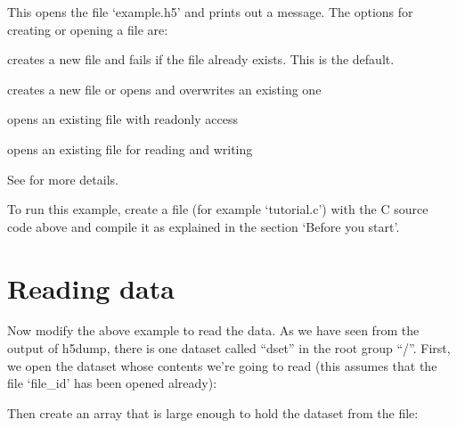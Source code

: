 \documentclass[letterpaper,10pt,english]{sphinxmanual}
\begin{document}
\sphinxAtStartPar
This opens the file ‘example.h5’ and prints out a message. The options for creating or opening a file are:
\begin{description}
\sphinxAtStartPar
creates a new file and fails if the file already exists. This is the default.

\sphinxAtStartPar
creates a new file or opens and overwrites an existing one

\sphinxAtStartPar
opens an existing file with read\sphinxhyphen{}only access

\sphinxAtStartPar
opens an existing file for reading and writing

\end{description}

\sphinxAtStartPar
See  for more details.

\sphinxAtStartPar
To run this example, create a file (for example ‘tutorial.c’) with the C source code above and compile it as explained in the section ‘Before you start’.


\chapter{Reading data}
\label{\detokenize{index:reading-data}}
\sphinxAtStartPar
Now modify the above example to read the data. As we have seen from the output of h5dump, there is one dataset called “dset” in the root group “/”. First, we open the dataset whose contents we’re going to read (this assumes that the file ‘file\_id’ has been opened already):

\begin{sphinxVerbatim}[commandchars=\\\{\}]
    
\end{sphinxVerbatim}

\sphinxAtStartPar
Then create an array that is large enough to hold the dataset from the file:

\begin{sphinxVerbatim}[commandchars=\\\{\}]
 \PYG{p}{[}\PYG{p}{]}\PYG{p}{[}\PYG{p}{]}
       
\end{sphinxVerbatim}
\end{document}
